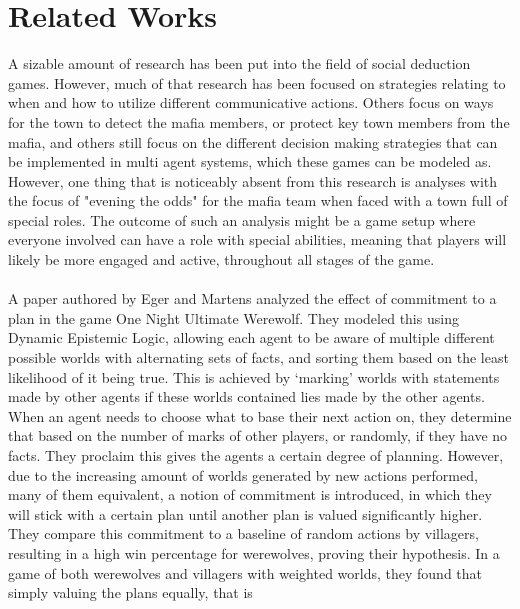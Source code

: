 \section{Related Works}
A sizable amount of research has been put into the field of social deduction 
games. However, much of that research has been focused on strategies relating 
to when and how to utilize different communicative actions\cite{commitment}. 
Others focus on ways for the town to detect the mafia 
members\cite{werewolf_stealth}, or protect key town members from the 
mafia\cite{werewolf_nash_equilibrium}, and others still focus on the different 
decision making strategies that can be implemented in multi agent systems, 
which these games can be modeled 
as\cite{modelling_multi_agent_epistemic_systems}\cite{multi_agent_epistemic_planner_common_knowledge}\cite{probibalistic_multiagent_systems}.
However, one thing that is noticeably absent from this research is analyses 
with the focus of "evening the odds" for the mafia team when faced with a town 
full of special roles. The outcome of such an analysis might be a game setup 
where everyone involved can have a role with special abilities, meaning that 
players will likely be more engaged and active, throughout all stages of the 
game. \\ \\
A paper authored by Eger and Martens\cite{commitment} analyzed the effect of 
commitment to a plan in the game One Night Ultimate Werewolf. They modeled this 
using Dynamic Epistemic Logic, allowing each agent to be aware of multiple 
different possible worlds with alternating sets of facts, and sorting them 
based on the least likelihood of it being true. This is achieved by ‘marking’ 
worlds with statements made by other agents if these worlds contained lies made 
by the other agents. When an agent needs to choose what to base their next 
action on, they determine that based on the number of marks of other players, or randomly, if they have no facts. They proclaim this gives the agents a certain degree of 
planning. However, due to the increasing amount of worlds generated by new 
actions performed, many of them equivalent, a notion of commitment is 
introduced, in which they will stick with a certain plan until another plan is 
valued significantly higher. They compare this commitment to a baseline of 
random actions by villagers, resulting in a high win percentage for werewolves, 
proving their hypothesis. In a game of both werewolves and villagers with 
weighted worlds, they found that simply valuing the plans equally, that is 
